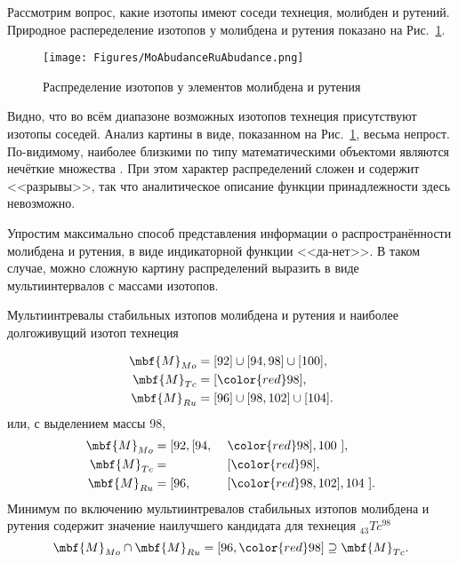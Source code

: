 \documentclass[a5paper,openany]{book}
\begin{document}
Рассмотрим вопрос, какие изотопы имеют соседи технеция, молибден и рутений. Природное распеределение изотопов у молибдена и рутения показано на Рис.~\ref{f:MoAbudanceRuAbudance}.
\begin{figure}[ht] 
	\centering\small
	\unitlength=1mm
	\texttt{[image: Figures/MoAbudanceRuAbudance.png]} 
	\caption{Распределение изотопов у элементов молибдена и рутения} 
	\label{f:MoAbudanceRuAbudance}
\end{figure}

Видно, что во всём диапазоне возможных изотопов технеция присутствуют изотопы соседей.
Анализ картины в виде, показанном на Рис.~\ref{f:MoAbudanceRuAbudance}, весьма непрост. По-видимому, наиболее близкими по типу математическими объектоми являются нечёткие множества \cite{Batyrshin2001}.
При этом характер распределений сложен и содержит <<разрывы>>, так что аналитическое описание функции принадлежности здесь невозможно.

Упростим максимально способ представления информации о распространённости молибдена и рутения, в виде индикаторной функции <<да-нет>>. В таком случае, можно сложную картину распределений выразить в виде мультиинтервалов с массами изотопов. 

Мультиинтревалы стабильных изтопов молибдена и рутения и наиболее долгоживущий изотоп технеция 

\begin{equation*}
	\begin{aligned}
		\mbf{M}_{Mo} & = [92] \cup  [94, 98] \cup [100], \\
		\mbf{M}_{Tc} &=  [ {\color{red}98}   ], \\
		\mbf{M}_{Ru} &= [96] \cup  [98, 102] \cup [104].
	\end{aligned}
\end{equation*}
или, с выделением массы 98,
\begin{equation*}
	\begin{aligned}
		\mbf{M}_{Mo} & = [92, [94,& ~{\color{red}98}]&, 100 \ ], \\
		\mbf{M}_{Tc} &=  &[ {\color{red}98} &  ], \\
		\mbf{M}_{Ru} &= [ 96,   & [{\color{red}98}&, 102], 104 \ ].
	\end{aligned}
\end{equation*}
Минимум по включению мультиинтревалов стабильных изтопов молибдена и рутения содержит значение наилучшего кандидата для технеция $_{43}Tc^{98}$ 
\begin{equation*}
	\mbf{M}_{Mo} \cap \mbf{M}_{Ru} = [96, {\color{red}98}] \supseteq \mbf{M}_{Tc}.
\end{equation*}
\end{document}
